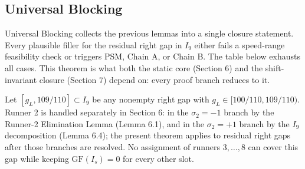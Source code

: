 \documentclass[12pt]{article}
\begin{document}
\subsection{Universal Blocking}

Universal Blocking collects the previous lemmas into a single closure statement. Every
plausible filler for the residual right gap in $I_9$ either fails a speed-range feasibility
check or triggers PSM, Chain A, or Chain B. The table below exhausts all cases. This
theorem is what both the static core (Section 6) and the shift-invariant closure (Section 7)
depend on: every proof branch reduces to it.

\begin{theorem}\label{t:55}
Let $[g_L,109/110]\subset I_9$ be any nonempty
right gap with $g_L\in[100/110,109/110)$. Runner 2 is handled separately in Section 6:
in the $\sigma_2=-1$ branch by the Runner-2 Elimination Lemma (Lemma 6.1), and in the
$\sigma_2=+1$ branch by the $I_9$ decomposition (Lemma 6.4); the present theorem applies
to residual right gaps after those branches are resolved. No assignment of runners
$3,\ldots,8$ can cover this gap while keeping $\mathrm{GF}(I_s)=0$ for every other slot.

\end{theorem}
\end{document}
